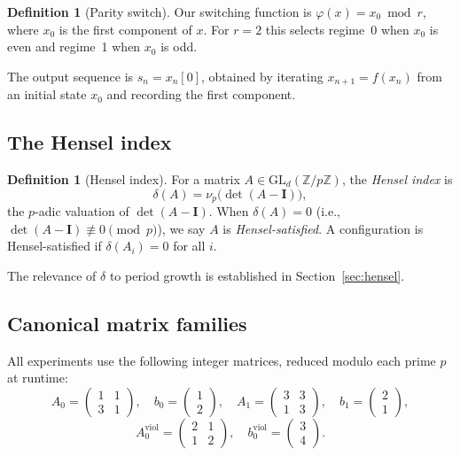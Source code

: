 \documentclass[11pt]{article}
\theoremstyle{plain}
\theoremstyle{definition}
\newtheorem{definition}[theorem]{Definition}
\newcommand{\Z}{\mathbb{Z}}
\newcommand{\vp}{\nu_p}
\newcommand{\GL}{\mathrm{GL}}
\newcommand{\Id}{\mathbf{I}}
\begin{document}
\begin{definition}[Parity switch]
Our switching function is $\varphi(x) = x_0 \bmod r$, where $x_0$ is the first component of $x$. For $r=2$ this selects regime~0 when $x_0$ is even and regime~1 when $x_0$ is odd.
\end{definition}

The output sequence is $s_n = x_n[0]$, obtained by iterating $x_{n+1} = f(x_n)$ from an initial state $x_0$ and recording the first component.

\subsection{The Hensel index}

\begin{definition}[Hensel index]
\label{def:hensel}
For a matrix $A \in \GL_d(\Z/p\Z)$, the \emph{Hensel index} is
\[
  \delta(A) = \vp\bigl(\det(A - \Id)\bigr),
\]
the $p$-adic valuation of $\det(A - \Id)$. When $\delta(A) = 0$ (i.e., $\det(A-\Id) \not\equiv 0 \pmod p$), we say $A$ is \emph{Hensel-satisfied}. A configuration is Hensel-satisfied if $\delta(A_i) = 0$ for all $i$.
\end{definition}

The relevance of $\delta$ to period growth is established in Section~\ref{sec:hensel}.

\subsection{Canonical matrix families}

All experiments use the following integer matrices, reduced modulo each prime $p$ at runtime:
\begin{equation}
  \label{eq:Acanon}
  A_0 = \begin{pmatrix}1&1\\3&1\end{pmatrix},\quad
  b_0 = \begin{pmatrix}1\\2\end{pmatrix},\quad
  A_1 = \begin{pmatrix}3&3\\1&3\end{pmatrix},\quad
  b_1 = \begin{pmatrix}2\\1\end{pmatrix},
\end{equation}
\begin{equation}
  \label{eq:Aviol}
  A_0^{\mathrm{viol}} = \begin{pmatrix}2&1\\1&2\end{pmatrix},\quad
  b_0^{\mathrm{viol}} = \begin{pmatrix}3\\4\end{pmatrix}.
\end{equation}
\end{document}
